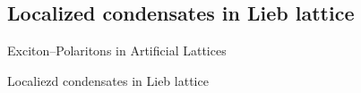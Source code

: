 \documentclass[9pt]{beamer}
\begin{document}
\subsection[Localized condensates]{Localized condensates in Lieb lattice }

\begin{frame}
\begin{center}
\begin{Huge}
Exciton--Polaritons in Artificial Lattices
\end{Huge}
\end{center}

{\vspace{1.25cm}
\begin{center}
\begin{LARGE}
Localiezd condensates in Lieb lattice~\cite{Sun:2018aa}
\end{LARGE}
\end{center}}
\end{frame}

\end{document}
